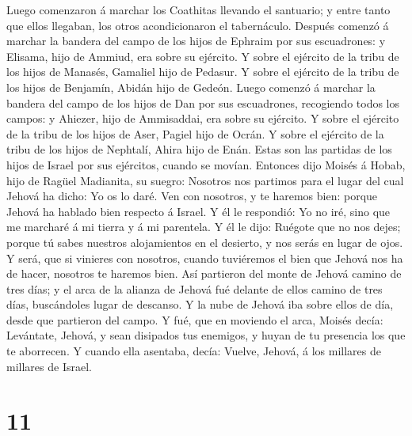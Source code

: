  Luego comenzaron á marchar los Coathitas llevando el
santuario; y entre tanto que ellos llegaban, los otros acondicionaron el
tabernáculo.  Después comenzó á marchar la bandera del
campo de los hijos de Ephraim por sus escuadrones: y Elisama, hijo de
Ammiud, era sobre su ejército.  Y sobre el ejército de la
tribu de los hijos de Manasés, Gamaliel hijo de Pedasur. 
Y sobre el ejército de la tribu de los hijos de Benjamín, Abidán hijo de
Gedeón.  Luego comenzó á marchar la bandera del campo de
los hijos de Dan por sus escuadrones, recogiendo todos los campos: y
Ahiezer, hijo de Ammisaddai, era sobre su ejército.  Y
sobre el ejército de la tribu de los hijos de Aser, Pagiel hijo de
Ocrán.  Y sobre el ejército de la tribu de los hijos de
Nephtalí, Ahira hijo de Enán.  Estas son las partidas de
los hijos de Israel por sus ejércitos, cuando se movían. 
Entonces dijo Moisés á Hobab, hijo de Ragüel Madianita, su suegro:
Nosotros nos partimos para el lugar del cual Jehová ha dicho: Yo os lo
daré. Ven con nosotros, y te haremos bien: porque Jehová ha hablado bien
respecto á Israel.  Y él le respondió: Yo no iré, sino
que me marcharé á mi tierra y á mi parentela.  Y él le
dijo: Ruégote que no nos dejes; porque tú sabes nuestros alojamientos en
el desierto, y nos serás en lugar de ojos.  Y será, que
si vinieres con nosotros, cuando tuviéremos el bien que Jehová nos ha de
hacer, nosotros te haremos bien.  Así partieron del monte
de Jehová camino de tres días; y el arca de la alianza de Jehová fué
delante de ellos camino de tres días, buscándoles lugar de descanso.
 Y la nube de Jehová iba sobre ellos de día, desde que
partieron del campo.  Y fué, que en moviendo el arca,
Moisés decía: Levántate, Jehová, y sean disipados tus enemigos, y huyan
de tu presencia los que te aborrecen.  Y cuando ella
asentaba, decía: Vuelve, Jehová, á los millares de millares de Israel.

\hypertarget{section-10}{%
\section{11}\label{section-10}}

